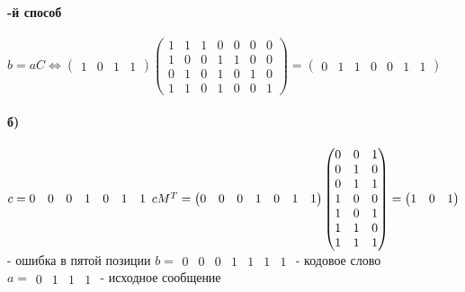 \documentclass[a4paper, 12pt]{article}
\newcommand{\RNum}[1]{\uppercase\expandafter{\romannumeral #1\relax}}
\begin{document}
\paragraph*{\RNum{2}-й способ}
$ b = aC \Leftrightarrow \begin{pmatrix}
    1 & 0 & 1 & 1
\end{pmatrix} \begin{pmatrix}
    1 & 1 & 1 & 0 & 0 & 0 & 0 \\
    1 & 0 & 0 & 1 & 1 & 0 & 0 \\
    0 & 1 & 0 & 1 & 0 & 1 & 0 \\
    1 & 1 & 0 & 1 & 0 & 0 & 1 
\end{pmatrix} = \begin{pmatrix}
    0 & 1 & 1 & 0 & 0 & 1 & 1
\end{pmatrix}$
\paragraph*{б)}
$ c = \begin{matrix}
    0 & 0 & 0 & 1 & 0 & 1 & 1
\end{matrix} \\ 
cM^T = \begin{pmatrix}
    0 & 0 & 0 & 1 & 0 & 1 & 1
\end{pmatrix}\begin{pmatrix}
    0 & 0 & 1 \\
    0 & 1 & 0 \\
    0 & 1 & 1 \\
    1 & 0 & 0 \\
    1 & 0 & 1 \\
    1 & 1 & 0 \\
    1 & 1 & 1
\end{pmatrix} = \begin{pmatrix}
    1 & 0 & 1
\end{pmatrix} $ - ошибка в пятой позиции $ b = \begin{matrix}
    0 & 0 & 0 & 1 & 1 & 1 & 1
\end{matrix} $ - кодовое слово \\ $ a = \begin{matrix}
    0 & 1 & 1 & 1
\end{matrix} $ - исходное сообщение
\end{document}
